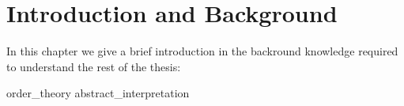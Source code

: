 \chapter{Introduction and Background}

In this chapter we give a brief introduction in the backround knowledge
required to understand the rest of the thesis:

{order_theory}
{abstract_interpretation}
